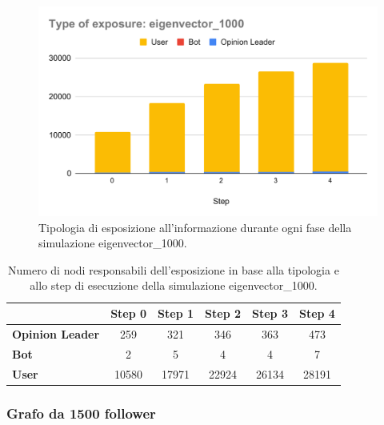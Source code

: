         \begin{figure}[H]
            \centering
            \includegraphics[width=.7\textwidth]{resources/charts/Type of exposure_ eigenvector_1000.pdf}
            \caption{Tipologia di esposizione all'informazione durante ogni fase della simulazione eigenvector\_1000.}
        \end{figure}
        
        \begin{table}[H]
            \centering
            \begin{tabular}{l|c|c|c|c|c}
                           & Step 0 & Step 1 & Step 2 & Step 3 & Step 4 \\ \hline
            \textbf{Opinion Leader} & 259    & 321    & 346    & 363    & 473    \\ \hline
            \textbf{Bot}            & 2      & 5      & 4      & 4      & 7      \\ \hline
            \textbf{User}           & 10580  & 17971  & 22924  & 26134  & 28191  \\
            \end{tabular}
            \caption{Numero di nodi responsabili dell'esposizione in base alla tipologia e allo step di esecuzione della simulazione eigenvector\_1000.}
        \end{table}

        \subsubsection{Grafo da 1500 follower}

